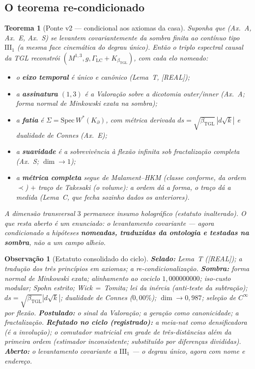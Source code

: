\documentclass[11pt,a4paper]{article}
\newcommand{\REAL}{\textsf{[REAL]}}
\newcommand{\bTGL}{\beta_{\mathrm{TGL}}}
\newtheorem{theorem}{Teorema}
\newtheorem{remark}{Observação}
\begin{document}
\subsection{O teorema re-condicionado}
\begin{theorem}[Ponte v2 --- condicional aos axiomas da casa]
\label{thm:pontev2}
Suponha que (Ax.~A, Ax.~E, Ax.~S) se levantem covariantemente da sombra
finita ao contínuo tipo $\mathrm{III}_1$ (a mesma face cinemática do
degrau único). Então o triplo espectral causal da TGL reconstrói
$(M^{1,3},g,\Gamma_{\mathrm{LC}}+K_{\bTGL})$, com cada elo nomeado:
\begin{itemize}[noitemsep]
\item o \textbf{eixo temporal} é único e canônico (Lema~T, \REAL);
\item a \textbf{assinatura} $(1,3)$ é a Valoração sobre a dicotomia
outer/inner (Ax.~A; forma normal de Minkowski exata na sombra);
\item a \textbf{fatia} é $\Sigma=\mathrm{Spec}\,W^*(K_\partial)$, com
métrica derivada $ds=\sqrt{\bTGL}\,|d\sqrt k|$ e dualidade de Connes
(Ax.~E);
\item a \textbf{suavidade} é a sobrevivência à flexão infinita sob
fractalização completa (Ax.~S; $\dim\to1$);
\item a \textbf{métrica completa} segue de Malament--HKM (classe
conforme, da ordem $\prec$) $+$ traço de Takesaki (o volume): a ordem dá
a forma, o traço dá a medida (Lema~C, que fecha sozinho dados os
anteriores).
\end{itemize}
A dimensão transversal $3$ permanece insumo holográfico (estatuto
inalterado). O que resta aberto é \emph{um} enunciado: o levantamento
covariante --- agora condicionado a hipóteses \textbf{nomeadas, traduzidas
da ontologia e testadas na sombra}, não a um campo alheio.
\end{theorem}

\begin{remark}[Estatuto consolidado do ciclo]
\textbf{Selado:} Lema~T (\REAL); a tradução dos três princípios em
axiomas; a re-condicionalização. \textbf{Sombra:} forma normal de
Minkowski exata; alinhamento ao cociclo $1{,}000000000$; iso-custo
modular; Spohn estrito; Wick$\,=\,$Tomita; lei da inércia (anti-teste da
subtração); $ds=\sqrt{\bTGL}|d\sqrt k|$; dualidade de Connes ($0{,}00\%$);
$\dim\to0{,}987$; seleção de $C^\infty$ por flexão. \textbf{Postulado:}
o sinal da Valoração; a geração como canonicidade; a fractalização.
\textbf{Refutado no ciclo (registrado):} a meia-nat como densificadora
(é a involução); o comutador matricial em grade de três-distâncias além
da primeira ordem (estimador inconsistente; substituído por diferenças
divididas). \textbf{Aberto:} o levantamento covariante a $\mathrm{III}_1$
--- o degrau único, agora com nome e endereço.
\end{remark}
\end{document}
